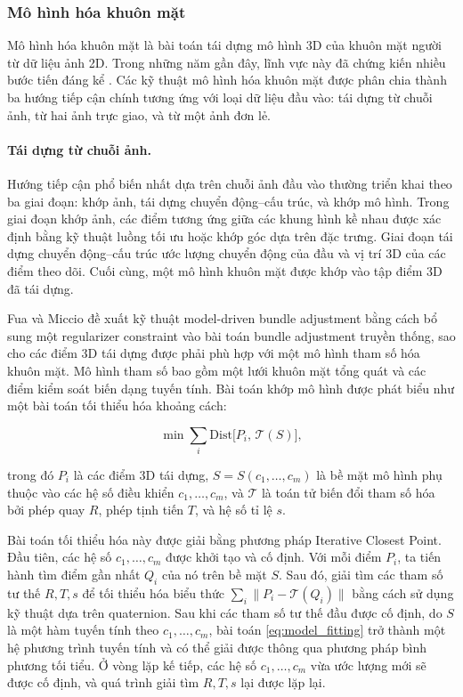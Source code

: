 \subsubsection{Mô hình hóa khuôn mặt}

Mô hình hóa khuôn mặt là bài toán tái dựng mô hình 3D của khuôn mặt người từ dữ liệu ảnh 2D. Trong những năm gần đây, lĩnh vực này đã chứng kiến nhiều bước tiến đáng kể \cite{fua1999animated, blanz1999morphable, liu2001rapid}. Các kỹ thuật mô hình hóa khuôn mặt được phân chia thành ba hướng tiếp cận chính tương ứng với loại dữ liệu đầu vào: tái dựng từ chuỗi ảnh, từ hai ảnh trực giao, và từ một ảnh đơn lẻ.

\paragraph{Tái dựng từ chuỗi ảnh.}\label{sec:face_modeling_from_img_sequence}
Hướng tiếp cận phổ biến nhất dựa trên chuỗi ảnh đầu vào thường triển khai theo ba giai đoạn: khớp ảnh, tái dựng chuyển động--cấu trúc, và khớp mô hình. Trong giai đoạn khớp ảnh, các điểm tương ứng giữa các khung hình kề nhau được xác định bằng kỹ thuật luồng tối ưu hoặc khớp góc dựa trên đặc trưng. Giai đoạn tái dựng chuyển động--cấu trúc ước lượng chuyển động của đầu và vị trí 3D của các điểm theo dõi. Cuối cùng, một mô hình khuôn mặt được khớp vào tập điểm 3D đã tái dựng.

Fua và Miccio \cite{fua1999animated} đề xuất kỹ thuật model-driven bundle adjustment bằng cách bổ sung một regularizer constraint vào bài toán bundle adjustment truyền thống, sao cho các điểm 3D tái dựng được phải phù hợp với một mô hình tham số hóa khuôn mặt. Mô hình tham số bao gồm một lưới khuôn mặt tổng quát và các điểm kiểm soát biến dạng tuyến tính. Bài toán khớp mô hình được phát biểu như một bài toán tối thiểu hóa khoảng cách:

\begin{equation}
    \min \sum_{i} \text{Dist}\bigl[P_i,\, \mathcal{T}(S)\bigr],
    \label{eq:model_fitting}
\end{equation}

trong đó $P_i$ là các điểm 3D tái dựng, $S = S(c_1, \dots, c_m)$ là bề mặt mô hình phụ thuộc vào các hệ số điều khiển $c_1, \dots, c_m$, và $\mathcal{T}$ là toán tử biến đổi tham số hóa bởi phép quay $R$, phép tịnh tiến $T$, và hệ số tỉ lệ $s$.

Bài toán tối thiểu hóa này được giải bằng phương pháp Iterative Closest Point. Đầu tiên, các hệ số $c_1, \dots, c_m$ được khởi tạo và cố định. Với mỗi điểm $P_i$, ta tiến hành tìm điểm gần nhất $Q_i$ của nó trên bề mặt $S$. Sau đó, giải tìm các tham số tư thế $R, T, s$ để tối thiểu hóa biểu thức $\sum_{i} \| P_i - \mathcal{T}(Q_i) \|$ bằng cách sử dụng kỹ thuật dựa trên quaternion. Sau khi các tham số tư thế đầu được cố định, do $S$ là một hàm tuyến tính theo $c_1, \dots, c_m$, bài toán \eqref{eq:model_fitting} trở thành một hệ phương trình tuyến tính và có thể giải được thông qua phương pháp bình phương tối tiểu. Ở vòng lặp kế tiếp, các hệ số $c_1, \dots, c_m$ vừa ước lượng mới sẽ được cố định, và quá trình giải tìm $R, T, s$ lại được lặp lại.

